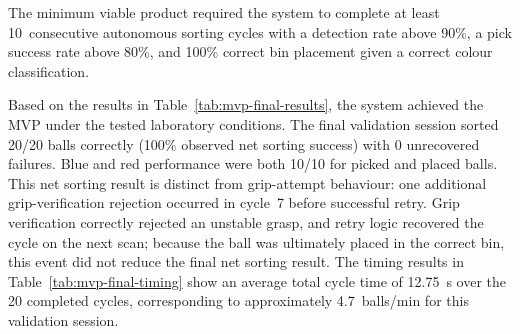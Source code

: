 
The minimum viable product required the system to complete at
least 10~consecutive autonomous sorting cycles with a detection
rate above 90\%, a pick success rate above 80\%, and 100\%
correct bin placement given a correct colour classification.

Based on the results in Table~\ref{tab:mvp-final-results}, the
system achieved the MVP under the tested laboratory conditions.
The final validation session sorted 20/20 balls correctly
(100\% observed net sorting success) with 0 unrecovered failures.
Blue and red performance were both 10/10 for picked and placed
balls. This net sorting result is distinct from grip-attempt
behaviour: one additional grip-verification rejection occurred in
cycle~7 before successful retry. Grip verification correctly
rejected an unstable grasp, and retry logic recovered the cycle
on the next scan; because the ball was ultimately placed in the
correct bin, this event did not reduce the final net sorting
result. The timing results in Table~\ref{tab:mvp-final-timing}
show an average total cycle time of 12.75~s over the 20
completed cycles, corresponding to approximately 4.7~balls/min
for this validation session.
